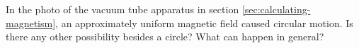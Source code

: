   In the photo of the vacuum tube apparatus in section
\ref{sec:calculating-magnetism}, an approximately uniform magnetic field caused circular
motion. Is there any other possibility besides a circle?
What can happen in general?
